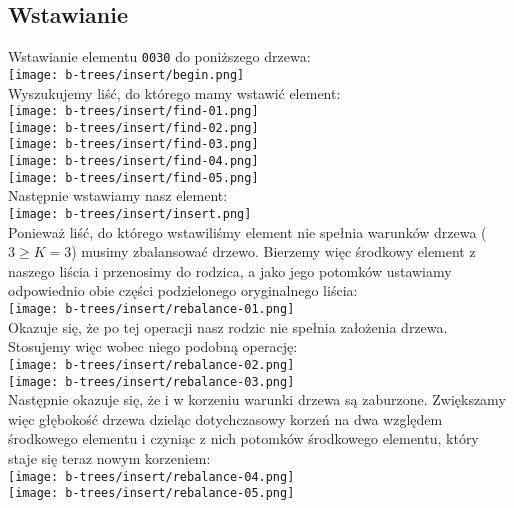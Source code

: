 \documentclass[main.tex]{subfiles}
\begin{document}
    \subsection{Wstawianie}
    Wstawianie elementu \texttt{0030} do poniższego drzewa: \\
    \texttt{[image: b-trees/insert/begin.png]} \\

    \noindent Wyszukujemy liść, do którego mamy wstawić element: \\
    \texttt{[image: b-trees/insert/find-01.png]} \\
    \texttt{[image: b-trees/insert/find-02.png]} \\
    \texttt{[image: b-trees/insert/find-03.png]} \\
    \texttt{[image: b-trees/insert/find-04.png]} \\
    \texttt{[image: b-trees/insert/find-05.png]} \\

    \noindent Następnie wstawiamy nasz element: \\
    \texttt{[image: b-trees/insert/insert.png]} \\

    \noindent Ponieważ liść, do którego wstawiliśmy element nie spełnia warunków drzewa ($3 \geq K=3$) musimy zbalansować drzewo. Bierzemy więc środkowy element z naszego liścia i przenosimy do rodzica, a jako jego potomków ustawiamy odpowiednio obie części podzielonego oryginalnego liścia: \\
    \texttt{[image: b-trees/insert/rebalance-01.png]} \\

    \noindent Okazuje się, że po tej operacji nasz rodzic nie spełnia założenia drzewa. Stosujemy więc wobec niego podobną operację: \\
    \texttt{[image: b-trees/insert/rebalance-02.png]} \\
    \texttt{[image: b-trees/insert/rebalance-03.png]} \\

    \noindent Następnie okazuje się, że i w korzeniu warunki drzewa są zaburzone. Zwiększamy więc głębokość drzewa dzieląc dotychczasowy korzeń na dwa względem środkowego elementu i czyniąc z nich potomków środkowego elementu, który staje się teraz nowym korzeniem: \\
    \texttt{[image: b-trees/insert/rebalance-04.png]} \\
    \texttt{[image: b-trees/insert/rebalance-05.png]} \\
\end{document}
